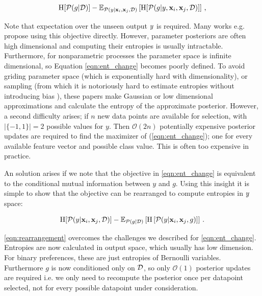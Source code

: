 \begin{align}   
\mathrm{H}[\mathcal{P}(g|\mathcal{D})] - \mathbb{E}_{\mathcal{P}(y|\mathbf{x}_i,\mathbf{x}_j,\mathcal{D})} \left[ \mathrm{H}[\mathcal{P}(g|y,\mathbf{x}_i,\mathbf{x}_j,\mathcal{D})]\right]\,,
\label{eqn:ent_change}
\end{align}

Note that expectation over the unseen output $y$ is required. Many works e.g. \citep{mackay1992, krishnapuram2004, lawrence2002} propose using this objective directly. However, parameter posteriors are often high dimensional and computing their entropies is usually intractable. Furthermore, for nonparametric processes the parameter space is infinite dimensional, so Equation \eqref{eqn:ent_change} becomes poorly defined. To avoid griding parameter space (which is exponentially hard with dimensionality), or sampling (from which it is notoriously hard to estimate entropies without introducing bias \citep{panzeri2007}), these papers make Gaussian or low dimensional approximations and calculate the entropy of the approximate posterior. However, a second difficulty arises; if $n$ new data points are
available for selection, with $|\{-1,1\}|=2$ possible values for $y$.
Then $\mathcal{O}(2n)$ potentially expensive posterior updates are required to find the maximizer
of (\ref{eqn:ent_change}); one for every available feature vector and possible class value.
This is often too expensive in practice.

An solution arises if we note that the objective in \eqref{eqn:ent_change} is equivalent to the conditional mutual information between $y$ and $g$. Using this insight it is simple to show that the objective can be rearranged to compute entropies in $y$ space:

\begin{align}
\mathrm{H}[\mathcal{P}(y|\mathbf{x}_i,\mathbf{x}_j,\mathcal{D})] - \mathbb{E}_{\mathcal{P}(g|\mathcal{D})}
\left[\mathrm{H}\left[ \mathcal{P}(y|\mathbf{x}_i,\mathbf{x}_j,g)\right]\right]\,. \label{eqn:rearrangement} 
\end{align}

\eqref{eqn:rearrangement} overcomes the challenges we described for \eqref{eqn:ent_change}. Entropies are now calculated in output space, which usually has low dimension. For binary preferences, these are just entropies of Bernoulli variables. Furthermore $g$ is now conditioned only on $\mathcal{D}$, so only $\mathcal{O}(1)$ posterior updates are required i.e. we only need to recompute the posterior once per datapoint selected, not for every possible datapoint under consideration. 

